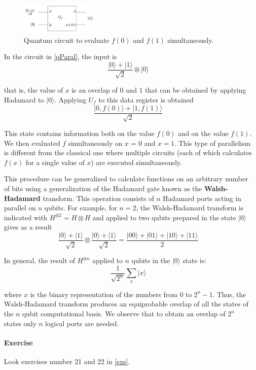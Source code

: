 \documentclass[a4paper,10pt]{article}
\begin{document}
\begin{figure}[!htb]
\begin{center}
\includegraphics[width=1.5in]{images/qParal.png}
\caption{Quantum circuit to evaluate $f(0)$ and $f(1)$ simultaneously.}
\label{qParal}
\end{center}
\end{figure}

In the circuit in \autoref{qParal}, the input is
$$\frac{|0\rangle + |1\rangle}{\sqrt{2}} \otimes |0\rangle$$

that is, the value of $x$ is an overlap of $0$ and $1$ that can be obtained by applying Hadamard to $|0\rangle$. Applying $U_f$ to this data register is obtained
$$\frac{|0, f(0)\rangle + |1, f(1)\rangle}{\sqrt{2}}$$

This state contains information both on the value $f(0)$ and on the value $f(1)$. We then evaluated $f$ simultaneously on $x$ = 0 and $x = 1$. This type of parallelism is different from the classical one where multiple circuits (each of which calculates $f(x)$ for a single value of $x$) are executed simultaneously.

This procedure can be generalized to calculate functions on an arbitrary number of bits using a generalization of the Hadamard gate known as the \textbf{Walsh-Hadamard} transform. This operation consists of $n$ Hadamard ports acting in parallel on $n$ qubits. For example, for $n = 2$, the Walsh-Hadamard transform is indicated with $H^{\otimes 2} = H \otimes H$ and applied to two qubits prepared in the state $|0\rangle$ gives as a result
$$\frac{|0\rangle + |1\rangle}{\sqrt{2}} \otimes \frac{|0\rangle + |1\rangle}{\sqrt{2}} = \frac{|00\rangle + |01\rangle + |10\rangle + |11\rangle}{2}$$

In general, the result of $H^{\otimes n}$ applied to $n$ qubits in the $|0\rangle$ state is:
$$\frac{1}{\sqrt{2^n}}\sum\limits_{x}|x\rangle$$

where $x$ is the binary representation of the numbers from $0$ to $2^n - 1$. Thus, the Walsh-Hadamard transform produces an equiprobable overlap of all the states of the $n$ qubit computational basis. We observe that to obtain an overlap of $2^n$ states only $n$ logical ports are needed.

\paragraph{Exercise} Look exercises number 21 and 22 in \autoref{exs}.
\end{document}
